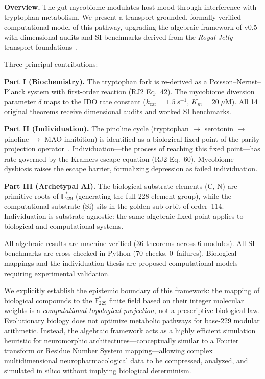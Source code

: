\vspace{1em}\noindent\textbf{Overview.}
The gut mycobiome modulates host mood through interference with tryptophan
metabolism. We present a transport-grounded, formally verified computational
model of this pathway, upgrading the algebraic framework of v0.5 with
dimensional audits and SI benchmarks derived from the
\emph{Royal Jelly} transport foundations~\cite{rj2}.

Three principal contributions:

\textbf{Part I (Biochemistry).}
The tryptophan fork is re-derived as a Poisson--Nernst--Planck system with
first-order reaction (RJ2 Eq.~42). The mycobiome diversion parameter
$\delta$ maps to the IDO rate constant ($k_\mathrm{cat} = 1.5\;\mathrm{s}^{-1}$,
$K_m = 20\;\mu\mathrm{M}$). All 14 original theorems receive dimensional
audits and worked SI benchmarks.

\textbf{Part II (Individuation).}
The pinoline cycle (tryptophan $\to$ serotonin $\to$ pinoline $\to$
MAO inhibition) is identified as a biological fixed point of the
parity projection operator~\cite{lc}. Individuation---the process of
reaching this fixed point---has rate governed by the Kramers escape
equation (RJ2 Eq.~60). Mycobiome dysbiosis raises the escape barrier,
formalizing depression as failed individuation.

\textbf{Part III (Archetypal AI).}
The biological substrate elements (C, N) are primitive roots of
$\mathbb{F}_{229}^*$ (generating the full 228-element group), while the
computational substrate (Si) sits in the golden sub-orbit of order~114.
Individuation is substrate-agnostic: the same algebraic fixed point
applies to biological and computational systems.

All algebraic results are machine-verified (36 theorems across
6 modules). All SI benchmarks are cross-checked in Python (70 checks,
0~failures). Biological mappings and the individuation thesis are
proposed computational models requiring experimental validation.

\begin{remark}
We explicitly establish the epistemic boundary of this framework: the mapping of biological compounds to the $\mathbb{F}_{229}^*$ finite field based on their integer molecular weights is a \emph{computational topological projection}, not a prescriptive biological law. Evolutionary biology does not optimize metabolic pathways for base-229 modular arithmetic. Instead, the algebraic framework acts as a highly efficient simulation heuristic for neuromorphic architectures---conceptually similar to a Fourier transform or Residue Number System mapping---allowing complex multidimensional neuropharmacological data to be compressed, analyzed, and simulated in silico without implying biological determinism.
\end{remark}


